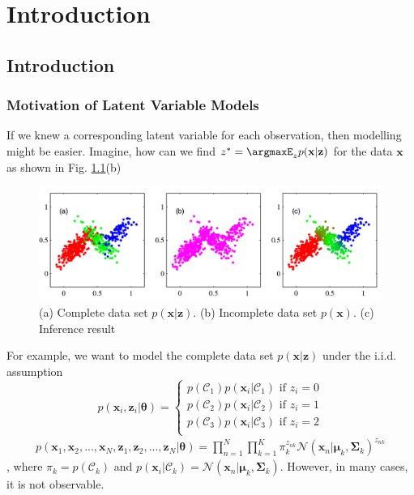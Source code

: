 \chapter{Introduction}
\section{Introduction}
\subsection{Motivation of Latent Variable Models}
\label{sec:intro_motivation}
If we knew a corresponding latent variable for each observation, then modelling might be easier. Imagine, how can we find $z^* = \argmaxE_{z} p(\mathbf{x|z})$ for the data $\mathbf{x}$ as shown in Fig. \ref{fig:clusters}(b)

\begin{figure}[h]
	\begin{center}			
		\includegraphics[scale=0.25]{./images/latent.png}
	\end{center}
	\caption{(a) Complete data set $p(\mathbf{x|z})$. (b) Incomplete data set $p(\mathbf{x})$. (c) Inference result}
	\label{fig:clusters}
\end{figure}
For example, we want to model the complete data set $p(\mathbf{x|z})$ under the i.i.d. assumption 
\begin{equation*}
p(\mathbf{x}_i, \mathbf{z}_i|\boldsymbol{\theta}) = 
\begin{cases}
p(\mathcal{C}_1)p(\mathbf{x}_i|\mathcal{C}_1) \textrm{ if } z_i=0\\
p(\mathcal{C}_2)p(\mathbf{x}_i|\mathcal{C}_2) \textrm{ if } z_i=1\\
p(\mathcal{C}_3)p(\mathbf{x}_i|\mathcal{C}_3) \textrm{ if } z_i=2\\
\end{cases}
\end{equation*}
\begin{align*}
p(\mathbf{x}_1, \mathbf{x}_2,...,\mathbf{x}_N, \mathbf{z}_1, \mathbf{z}_2, ..., \mathbf{z}_N|\boldsymbol{\theta}) = \prod_{n=1}^{N}\prod_{k=1}^{K}\pi_k^{z_{nk}}\mathcal{N}(\mathbf{x}_n|\boldsymbol{\mu}_k, \boldsymbol{\Sigma}_k)^{z_{nk}}
\end{align*}
, where $\pi_k=p(\mathcal{C}_k)$ and $p(\mathbf{x}_i|\mathcal{C}_k)=\mathcal{N}(\mathbf{x}_n|\boldsymbol{\mu}_k, \boldsymbol{\Sigma}_k)$. However, in many cases, it is not observable. 

